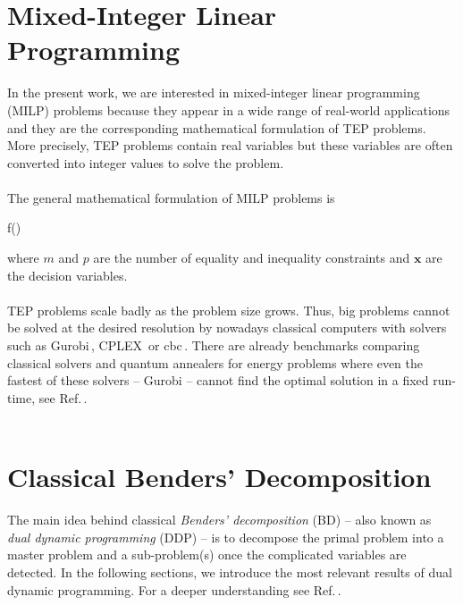 \section{Mixed-Integer Linear Programming}
In the present work, we are interested in mixed-integer linear programming (MILP) problems because they appear in a wide range of real-world applications and they are the corresponding mathematical formulation of TEP problems. More precisely, TEP problems contain real variables but these variables are often converted into integer values to solve the problem.\\\\
The general mathematical formulation of MILP problems is
\begin{mini!}[2]
	{}{f()}{\label{eq: MILP}}{}{}
\end{mini!}
where $m$ and $p$ are the number of equality and inequality constraints and $\mathbf{x}$ are the decision variables.\\\\
TEP problems scale badly as the problem size grows. Thus, big problems cannot be solved at the desired resolution by nowadays classical computers with solvers such as Gurobi\,\cite{gurobi}, CPLEX\,\cite{cplex2009v12} or cbc\,\cite{cbc}. There are already benchmarks comparing classical solvers and quantum annealers for energy problems where even the fastest of these solvers -- Gurobi -- cannot find the optimal solution in a fixed run-time, see Ref.\,\cite{Fernandez-Campoamor2021CommunityAnnealing}. \\\\
\section{Classical Benders' Decomposition}
The main idea behind classical \textit{Benders' decomposition} (BD) -- also known as \textit{dual dynamic programming} (DDP) -- is to decompose the primal problem into a master problem and a sub-problem(s) once the complicated variables are detected. In the following sections, we introduce the most relevant results of dual dynamic programming. For a deeper understanding see Ref.\,\cite{bierlaire2018}.
